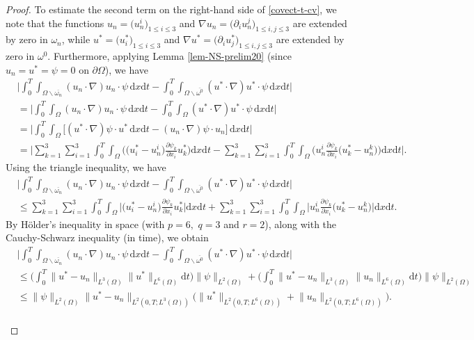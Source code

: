 \documentclass[a4paper,12pt,reqno,natbib]{amsart}
\newcommand{\dx} {\displaystyle\mathrm{d}x}
\newcommand{\dt} {\displaystyle\mathrm{d}t}
\begin{document}
\begin{proof}
\noindent To estimate the second term on the right-hand side of \eqref{covect-t-cv}, we note that the functions $u_n=\big(u_n^i\big)_{1\leq i\leq 3}$ and $\nabla u_n=\big( \partial_i u_n^j\big)_{1\leq i,j\leq 3}$ are extended by zero in $\omega_n$, while $u^*=\big(u^*_i\big)_{1\leq i\leq 3}$ and $\nabla u^*=\big( \partial_i u^*_j\big)_{1\leq i,j\leq 3}$ are extended by zero in $\omega^0$. Furthermore, applying Lemma \ref{lem-NS-prelim20} (since $u_n=u^*=\psi=0$ on $\partial\Omega$), we have
\begin{align*}
&\big|\int_0^T\int_{\Omega\backslash\overline{\omega_n}} (u_n\cdot \nabla) u_n \cdot \psi\, \dx\dt  -\int_0^T\int_{\Omega\backslash\overline{\omega^0}} (u^*\cdot \nabla) u^* \cdot \psi\, \dx\dt\big|\\
&=\big|\int_0^T\int_{\Omega} (u_n\cdot \nabla )u_n \cdot \psi\, \dx\dt  -\int_0^T\int_{\Omega} (u^*\cdot \nabla) u^* \cdot \psi\, \dx\dt\big|\\
&=\big|\int_0^T\int_{\Omega} \big[(u^*\cdot \nabla) \psi \cdot u^*\, \dx\dt  - (u_n\cdot \nabla) \psi \cdot u_n\big]\, \dx\dt\big|\\
&=\big| \sum_{k=1}^3\sum_{i=1}^3\int_0^T\int_\Omega\big( \big(u_i^*-u_n^i\big)\frac{\partial \psi_k}{\partial x_i}u^*_k\big)\dx\dt   -   \sum_{k=1}^3\sum_{i=1}^3\int_0^T\int_\Omega\big( u_n^i\frac{\partial \psi_k}{\partial x_i}\big(u_k^*-u_n^k\big)\big)\dx\dt  \big|.
\end{align*} 
Using the triangle inequality, we have
\begin{align*}
&\big|\int_0^T\int_{\Omega\backslash\overline{\omega_n}} (u_n\cdot \nabla )u_n \cdot \psi\, \dx\dt  -\int_0^T\int_{\Omega\backslash\overline{\omega^0}} (u^*\cdot \nabla )u^* \cdot \psi\, \dx\dt\big|\\
&\leq  \sum_{k=1}^3\sum_{i=1}^3\int_0^T\int_\Omega\big| \big(u_i^*-u_n^i\big)\frac{\partial \psi_k}{\partial x_i}u^*_k\big|\dx\dt  
+     \sum_{k=1}^3\sum_{i=1}^3\int_0^T\int_\Omega\big| u_n^i\frac{\partial \psi_k}{\partial x_i}\big(u_k^*-u_n^k\big)\big|\dx\dt .
\end{align*} 
By H\"older's inequality in space (with $p=6,$ $q=3$ and $r=2$), along with the Cauchy-Schwarz inequality (in time), we obtain
\begin{align*}
&\big|\int_0^T\int_{\Omega\backslash\overline{\omega_n}} (u_n\cdot \nabla) u_n \cdot \psi\, \dx\dt  -\int_0^T\int_{\Omega\backslash\overline{\omega^0}} (u^*\cdot \nabla) u^* \cdot \psi\, \dx\dt\big|\\
&\leq\big(\int_0^T\big\|u^*-u_n  \big\|_{L^3(\Omega)}   \big\| u^* \big\|_{L^6(\Omega)}\dt \big)  \big\| \psi \big\|_{L^2(\Omega)}+\big(\int_0^T\big\|u^*-u_n  \big\|_{L^3(\Omega)}   \big\| u_n \big\|_{L^6(\Omega)}\dt \big)  \big\| \psi \big\|_{L^2(\Omega)}\\
&\leq  \big\| \psi \big\|_{L^2(\Omega)} \big\|u^*-u_n  \big\|_{L^2(0,T;L^3(\Omega))}\big(  \big\|u^*  \big\|_{L^2(0,T;L^6(\Omega))}+\big\|u_n  \big\|_{L^2(0,T;L^6(\Omega))} \big).
\end{align*} \\


\end{proof}
\end{document}

